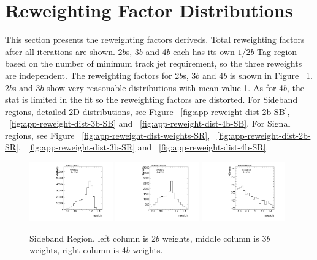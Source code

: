 \section{Reweighting Factor Distributions }
\label{app:reweight-dist}

This section presents the reweighting factors deriveds. Total reweighting factors after all iterations are shown. 2$b$s, 3$b$ and 4$b$ each has its own $1/2b$ Tag region based on the number of minimum track jet requirement, so the three reweights are independent. The reweighting factors for 2$b$s, 3$b$ and 4$b$ is shown in Figure ~\ref{fig:app-reweight-dist-weights-SB}. 2$b$s and 3$b$ show very reasonable distributions with mean value 1. As for 4$b$, the stat is limited in the fit so the reweighting factors are distorted. For Sideband regions, detailed 2D distributions, see Figure ~\ref{fig:app-reweight-dist-2b-SB}, ~\ref{fig:app-reweight-dist-3b-SB} and ~\ref{fig:app-reweight-dist-4b-SB}. For Signal regions, see Figure ~\ref{fig:app-reweight-dist-weights-SR}, ~\ref{fig:app-reweight-dist-2b-SR}, ~\ref{fig:app-reweight-dist-3b-SR} and ~\ref{fig:app-reweight-dist-4b-SR}.

\begin{figure}[htbp!]
\begin{center}
\includegraphics[width=0.32\textwidth,angle=-90]{figures/boosted/AppendixReweight/Weights/2Trk_split_Sideband_leadHCand_Pt_m_weight_projy.pdf}
\includegraphics[width=0.32\textwidth,angle=-90]{figures/boosted/AppendixReweight/Weights/3Trk_Sideband_leadHCand_Pt_m_weight_projy.pdf}
\includegraphics[width=0.32\textwidth,angle=-90]{figures/boosted/AppendixReweight/Weights/4Trk_Sideband_leadHCand_Pt_m_weight_projy.pdf}\\
\caption{Sideband Region, left column is 2$b$ weights, middle column is 3$b$ weights, right column is 4$b$ weights.}
\label{fig:app-reweight-dist-weights-SB}
\end{center}
\end{figure}

